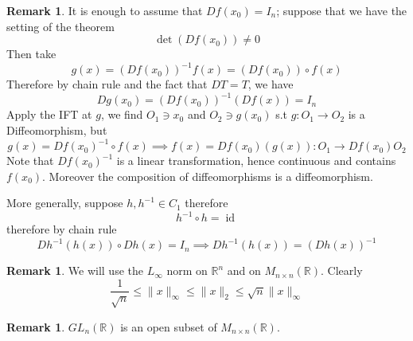 \documentclass[11pt,a4paper]{article}
\theoremstyle{definition}
\newtheorem{remark}[definition]{Remark}
\theoremstyle{plain}
\theoremstyle{remark}
\newcommand{\R}{\mathbb{R}}
\newcommand{\norm}[1]{\lVert #1 \rVert}
\begin{document}
\begin{remark}
    It is enough to assume that $Df(x_0) = I_n$; suppose that we have the setting of the theorem 
    $$\det (Df(x_0)) \ne 0$$
    Then take 
    $$g(x) = (Df(x_0))^{-1} f(x) = (Df(x_0)) \circ f (x)$$
    Therefore by chain rule and the fact that $DT = T$, we have 
    $$Dg(x_0) = (Df(x_0))^{-1} (Df(x)) = I_n$$ 
    Apply the IFT at $g$, we find $O_1 \ni x_0$ and $O_2 \ni g(x_0)$ s.t 
    $g \colon O_1 \to O_2$ is a Diffeomorphism, but 
    $$g(x) = Df(x_0)^{-1} \circ f(x) \implies f(x) = Df(x_0) (g(x)) \colon O_1 \to Df(x_0) O_2$$
    Note that $Df(x_0)^{-1}$ is a linear transformation, hence continuous and contains $f(x_0)$. Moreover the composition 
    of diffeomorphisms is a diffeomorphism.
    
    More generally, suppose $h, h^{-1} \in C_1$ therefore 
    $$h^{-1} \circ h = \operatorname{id}$$
    therefore by chain rule 
    $$Dh^{-1} (h(x)) \circ Dh(x) = I_n \implies Dh^{-1} (h(x)) = (Dh(x))^{-1}$$
\end{remark}

\begin{remark}
    We will use the $L_\infty$ norm on $\R^n$ and on $M_{n \times n} (\R)$.
    Clearly 
    $$\frac{1}{\sqrt{n}} \le \norm{x}_\infty \le \norm{x}_2 \le \sqrt{n} \norm{x}_\infty$$
\end{remark}

\begin{remark}
    $GL_n(\R)$ is an open subset of $M_{n \times n} (\R)$.
\end{remark}
\end{document}

